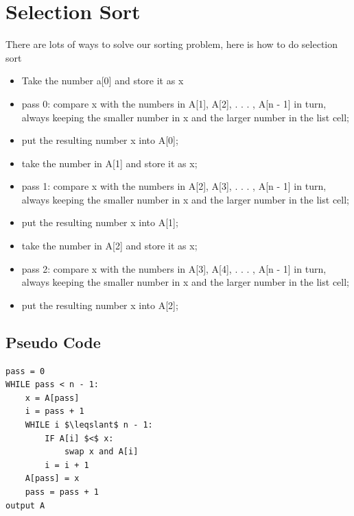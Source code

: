 \documentclass{article}[18pt]
\begin{document}
\section{Selection Sort}
There are lots of ways to solve our sorting problem, here is how to do selection sort
\begin{itemize}
	\item Take the number a[0] and store it as x
	\item pass 0: compare x with the numbers in A[1], A[2], . . . , A[n - 1] in turn,
	always keeping the smaller number in x and the larger number in the
	list cell;
	\item put the resulting number x into A[0];
	\item take the number in A[1] and store it as x;
	\item pass 1: compare x with the numbers in A[2], A[3], . . . , A[n - 1] in turn,
	always keeping the smaller number in x and the larger number in the
	list cell;
	\item put the resulting number x into A[1];
	\item take the number in A[2] and store it as x;
	\item pass 2: compare x with the numbers in A[3], A[4], . . . , A[n - 1] in turn,
	always keeping the smaller number in x and the larger number in the
	list cell;
	\item put the resulting number x into A[2];
\end{itemize}
\subsection{Pseudo Code}
\begin{lstlisting}[tabsize=4,mathescape]
pass = 0 
WHILE pass < n - 1:
	x = A[pass]
	i = pass + 1 
	WHILE i $\leqslant$ n - 1: 
		IF A[i] $<$ x:
			swap x and A[i]
		i = i + 1
	A[pass] = x
	pass = pass + 1
output A
\end{lstlisting}
\end{document}
